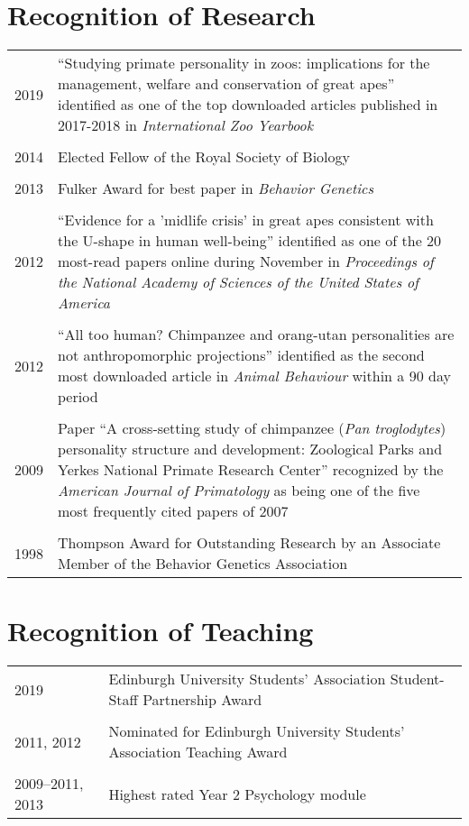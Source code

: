 \documentclass[11pt]{article}
\begin{document}
\section*{Recognition of Research}
\begin{tabular}{p{3cm}p{12cm}}
2019 &  ``Studying primate personality in zoos: implications for the
management, welfare and conservation of great apes'' identified as one
of the top downloaded articles published in 2017-2018 in
\textit{International Zoo Yearbook} \\ \\

2014 & Elected Fellow of the Royal Society of Biology \\ \\

2013 & Fulker Award for best paper in \textit{Behavior Genetics} \\ \\

2012 & ``Evidence for a 'midlife crisis' in great apes consistent with
the U-shape in human well-being'' identified as one of the 20
most-read papers online during November in \textit{Proceedings of the National Academy of
Sciences of the United States of America} \\ \\

2012 & ``All too human? Chimpanzee and orang-utan personalities are
not anthropomorphic projections'' identified as the second most
downloaded article in \textit{Animal Behaviour} within a 90 day period
\\ \\

2009 & Paper ``A cross-setting study of chimpanzee (\textit{Pan
troglodytes}) personality structure and development: Zoological
Parks and Yerkes National Primate Research Center'' recognized by the
\textit{American Journal of Primatology} as being one of the five most
frequently cited papers of 2007 \\ \\

1998 & Thompson Award for Outstanding
Research by an Associate Member of the Behavior Genetics Association
\end{tabular}

\section*{Recognition of Teaching}
\begin{tabular}{p{3cm}p{12cm}}
2019 & Edinburgh University Students' Association Student-Staff
Partnership Award \\ \\

2011, 2012 & Nominated for Edinburgh University Students' Association
Teaching Award \\ \\

2009--2011, 2013 & Highest rated Year 2 Psychology module 
\end{tabular}
\end{document}
